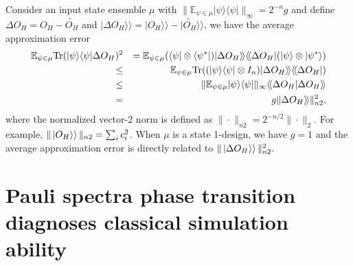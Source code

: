 \documentclass[showpacs,amsmath,amssymb,twocolumn,superscriptaddress,notitlepage,preprintnumbers,aps,pra,10pt,floatfix]{revtex4-2}
\begin{document}
\begin{appendix}
Consider an input state ensemble $\mu$ with $\|\mathbb{E}_{\psi\in\mu}|\psi\rangle\langle \psi|\|_{\infty}=2^{-n}g$ and define $\Delta O_{H}=O_H-\widetilde{O_H}$ and ${|\Delta O_{H}\rangle\!\rangle}=|{O_H\rangle\!\rangle}-|{\widetilde{O_H}\rangle\!\rangle}$, we have the average approximation error
\begin{eqnarray}\label{eq:hpt}
\mathbb{E}_{\psi\in\mu}\mathrm{Tr}(|\psi\rangle\langle\psi| \Delta O_H)^2&&=\mathbb{E}_{\psi\in\mu}(\langle\psi|\otimes \langle\psi^*| )|{\Delta O_{H}\rangle\!\rangle}{\langle\!\langle\Delta O_{H}|}(|\psi\rangle\otimes |\psi^*\rangle)\nonumber\\
\leq && \mathbb{E}_{\psi\in\mu}\mathrm{Tr}((|\psi\rangle\langle \psi| \otimes I_n)|{\Delta O_{H}\rangle\!\rangle}{\langle\!\langle\Delta O_{H}|})\nonumber\\
\leq && \|\mathbb{E}_{\psi\in\mu}|\psi\rangle\langle \psi|\|_{\infty}{\langle\!\langle\Delta O_{H}|\Delta O_{H}\rangle\!\rangle}\nonumber\\
=&&g \|{\Delta O_{H}\rangle\!\rangle}\|_{n2}^2,
\end{eqnarray}
where the normalized vector-2 norm is defined as $\|\cdot\|_{n2}=2^{-n/2}\|\cdot\|_{2}$. For example, $\|\ket{O_H\rangle}\|_{n2}=\sum_i c_i^2$. When $\mu$ is a state 1-design, we have $g=1$ and the average approximation error is directly related to $\|\ket{\Delta O_{H}\rangle}\|_{n2}^2$.

\section{Pauli spectra phase transition diagnoses classical simulation ability}


\end{appendix}
\end{document}
